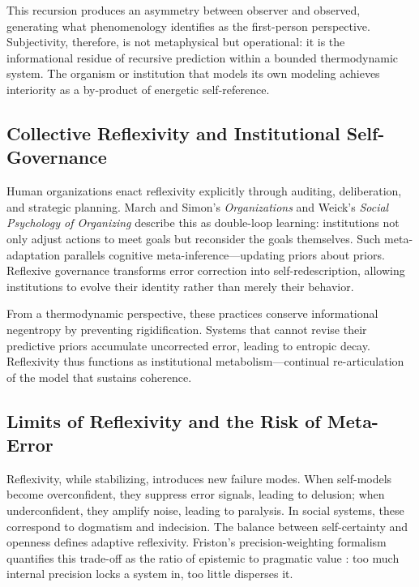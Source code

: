 \documentclass[11pt,a4paper]{article}
\begin{document}
This recursion produces an asymmetry between observer and observed, generating what phenomenology identifies as the first-person perspective.  Subjectivity, therefore, is not metaphysical but operational: it is the informational residue of recursive prediction within a bounded thermodynamic system.  The organism or institution that models its own modeling achieves interiority as a by-product of energetic self-reference.

\subsection{Collective Reflexivity and Institutional Self-Governance}

Human organizations enact reflexivity explicitly through auditing, deliberation, and strategic planning.  March and Simon’s \emph{Organizations} \citep{MarchSimon1958Organizations} and Weick’s \emph{Social Psychology of Organizing} \citep{Weick1979SocialPsychOrganization} describe this as double-loop learning: institutions not only adjust actions to meet goals but reconsider the goals themselves.  Such meta-adaptation parallels cognitive meta-inference—updating priors about priors.  Reflexive governance transforms error correction into self-redescription, allowing institutions to evolve their identity rather than merely their behavior.

From a thermodynamic perspective, these practices conserve informational negentropy by preventing rigidification.  Systems that cannot revise their predictive priors accumulate uncorrected error, leading to entropic decay.  Reflexivity thus functions as institutional metabolism—continual re-articulation of the model that sustains coherence.

\subsection{Limits of Reflexivity and the Risk of Meta-Error}

Reflexivity, while stabilizing, introduces new failure modes.  When self-models become overconfident, they suppress error signals, leading to delusion; when underconfident, they amplify noise, leading to paralysis.  In social systems, these correspond to dogmatism and indecision.  The balance between self-certainty and openness defines adaptive reflexivity.  Friston’s precision-weighting formalism quantifies this trade-off as the ratio of epistemic to pragmatic value \citep{Friston2013LifeAsWeKnowIt}: too much internal precision locks a system in, too little disperses it.
\end{document}
